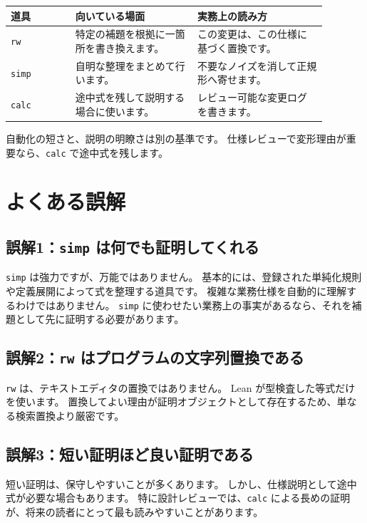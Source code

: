 \begin{center}
\begin{tabular}{p{0.18\linewidth}p{0.34\linewidth}p{0.36\linewidth}}
\toprule
道具 & 向いている場面 & 実務上の読み方 \\
\midrule
\texttt{rw} & 特定の補題を根拠に一箇所を書き換えます。
& この変更は、この仕様に基づく置換です。 \\
\texttt{simp} & 自明な整理をまとめて行います。
& 不要なノイズを消して正規形へ寄せます。 \\
\texttt{calc} & 途中式を残して説明する場合に使います。
& レビュー可能な変更ログを書きます。 \\
\bottomrule
\end{tabular}
\end{center}

自動化の短さと、説明の明瞭さは別の基準です。
仕様レビューで変形理由が重要なら、\texttt{calc} で途中式を残します。

\section{よくある誤解}

\subsection{誤解1：\texttt{simp} は何でも証明してくれる}

\texttt{simp} は強力ですが、万能ではありません。
基本的には、登録された単純化規則や定義展開によって式を整理する道具です。
複雑な業務仕様を自動的に理解するわけではありません。
\texttt{simp} に使わせたい業務上の事実があるなら、それを補題として先に証明する必要があります。

\subsection{誤解2：\texttt{rw} はプログラムの文字列置換である}

\texttt{rw} は、テキストエディタの置換ではありません。
Lean が型検査した等式だけを使います。
置換してよい理由が証明オブジェクトとして存在するため、単なる検索置換より厳密です。

\subsection{誤解3：短い証明ほど良い証明である}

短い証明は、保守しやすいことが多くあります。
しかし、仕様説明として途中式が必要な場合もあります。
特に設計レビューでは、\texttt{calc} による長めの証明が、将来の読者にとって最も読みやすいことがあります。

